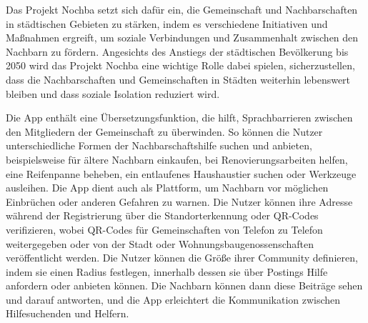 Das Projekt Nochba setzt sich dafür ein, die Gemeinschaft und Nachbarschaften in städtischen Gebieten zu stärken, indem es verschiedene Initiativen und Maßnahmen ergreift, um soziale Verbindungen und Zusammenhalt zwischen den Nachbarn zu fördern. Angesichts des Anstiegs der städtischen Bevölkerung bis 2050 wird das Projekt Nochba eine wichtige Rolle dabei spielen, sicherzustellen, dass die Nachbarschaften und Gemeinschaften in Städten weiterhin lebenswert bleiben und dass soziale Isolation reduziert wird.

Die App enthält eine Übersetzungsfunktion, die hilft, Sprachbarrieren zwischen den Mitgliedern der Gemeinschaft zu überwinden. So können die Nutzer unterschiedliche Formen der Nachbarschaftshilfe suchen und anbieten, beispielsweise für ältere Nachbarn einkaufen, bei Renovierungsarbeiten helfen, eine Reifenpanne beheben, ein entlaufenes Haushaustier suchen oder Werkzeuge ausleihen. Die App dient auch als Plattform, um Nachbarn vor möglichen Einbrüchen oder anderen Gefahren zu warnen. Die Nutzer können ihre Adresse während der Registrierung über die Standorterkennung oder QR-Codes verifizieren, wobei QR-Codes für Gemeinschaften von Telefon zu Telefon weitergegeben oder von der Stadt oder Wohnungsbaugenossenschaften veröffentlicht werden. Die Nutzer können die Größe ihrer Community definieren, indem sie einen Radius festlegen, innerhalb dessen sie über Postings Hilfe anfordern oder anbieten können. Die Nachbarn können dann diese Beiträge sehen und darauf antworten, und die App erleichtert die Kommunikation zwischen Hilfesuchenden und Helfern.

